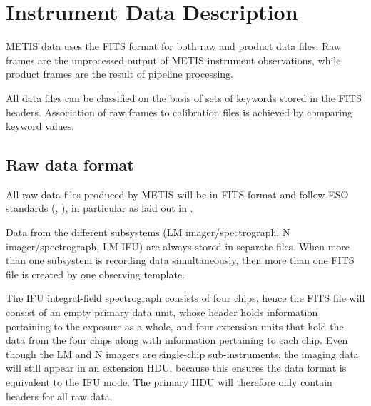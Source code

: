 
\clearpage
\section{Instrument Data Description}
\label{sec:instrument_data_description}

METIS data uses the FITS format for both raw and product data
files. Raw frames are the unprocessed output of METIS instrument
observations, while product frames are the result of pipeline
processing.

All data files can be classified on the basis of sets of keywords
stored in the FITS headers. Association of raw frames to calibration
files is achieved by comparing keyword values.


\subsection{Raw data format}
\label{ssec:instrument_data_format}

All raw data files produced by METIS will be in FITS format and follow
ESO standards (, ), in particular as
laid out in \cite{ESO-DICD}.

Data from the different subsystems (LM imager/spectrograph, N
imager/spectrograph, LM IFU) are always stored in separate files.
When more than one subsystem is recording data simultaneously, then
more than one FITS file is created by one observing template.

 The IFU
integral-field spectrograph consists of four chips, hence the FITS
file will consist of an empty primary data unit, whose header holds
information pertaining to the exposure as a whole, and four extension
units that hold the data from the four chips along with information
pertaining to each chip.
Even though the LM and N imagers are single-chip sub-instruments, the
imaging data will still appear in an extension HDU, because this ensures
the data format is equivalent to the IFU mode.
The primary HDU will therefore only contain headers for all raw data.

